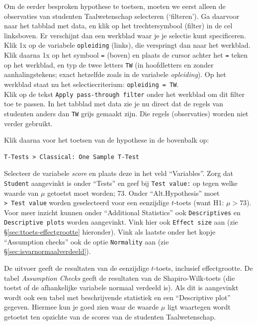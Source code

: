 \documentclass[
]{book}
\begin{document}
Om de eerder besproken hypothese te toetsen, moeten we eerst alleen de
observaties van studenten Taalwetenschap selecteren (`filteren'). Ga
daarvoor naar het tabblad met data, en klik op het trechtersymbool
(filter) in de cel linksboven. Er verschijnt dan een werkblad waar je je
selectie kunt specificeren.\\
Klik 1x op de variabele \texttt{opleiding} (links), die verspringt dan naar het
werkblad. Klik daarna 1x op het symbool \texttt{=} (boven) en plaats de cursor
achter het \texttt{=} teken op het werkblad, en typ de twee letters \texttt{TW} (in
hoofdletters en zonder aanhalingstekens; exact hetzelfde zoals in de
variabele \emph{opleiding}). Op het werkblad staat nu het selectiecriterium:
\texttt{opleiding\ =\ TW}.\\
Klik op de tekst \texttt{Apply\ pass-through\ filter} onder het werkblad om dit
filter toe te passen. In het tabblad met data zie je nu direct dat de
regels van studenten anders dan \texttt{TW} grijs gemaakt zijn. Die regels
(observaties) worden niet verder gebruikt.

Klik daarna voor het toetsen van de hypothese in de bovenbalk op:

\begin{verbatim}
T-Tests > Classical: One Sample T-Test
\end{verbatim}

Selecteer de variabele \emph{score} en plaats deze in het veld ``Variables''.
Zorg dat \texttt{Student} aangevinkt is onder ``Tests'' en geef bij \texttt{Test\ value:}
op tegen welke waarde van \(\mu\) getoetst moet worden; 73. Onder
``Alt.Hypothesis'' moet \texttt{\textgreater{}\ Test\ value} worden geselecteerd voor een
eenzijdige \(t\)-toets (want H1: \(\mu > 73\)). Voor meer inzicht kunnen
onder ``Additional Statistics'' ook \texttt{Descriptives} en \texttt{Descriptive\ plots}
worden aangevinkt. Vink hier ook \texttt{Effect\ size} aan (zie
§\ref{sec:ttoets-effectgrootte} hieronder). Vink als laatste onder het
kopje ``Assumption checks'' ook de optie \texttt{Normality} aan (zie
§\ref{sec:isvarnormaalverdeeld}).

De uitvoer geeft de resultaten van de eenzijdige \(t\)-toets, inclusief
effectgrootte. De tabel \emph{Assumption Checks} geeft de resultaten van de
Shapiro-Wilk-toets (die toetst of de afhankelijke variabele normaal
verdeeld is). Als dit is aangevinkt wordt ook een tabel met
beschrijvende statistiek en een ``Descriptive plot'' gegeven. Hiermee kun
je goed zien waar de waarde \(\mu\) ligt waartegen wordt getoetst ten
opzichte van de scores van de studenten Taalwetenschap.
\end{document}
